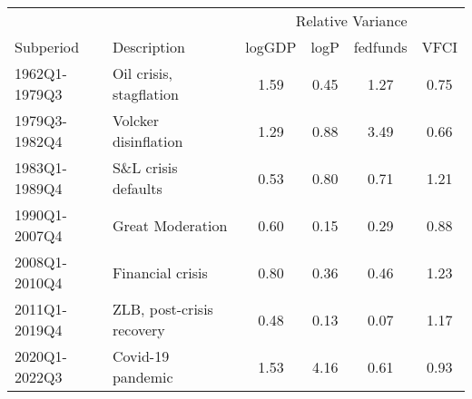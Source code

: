 \begingroup
\fontsize{12.0pt}{14.4pt}\selectfont
\begin{tabular}{llcccc}
\toprule
 &  & \multicolumn{4}{c}{Relative Variance} \\ 
\cmidrule(lr){3-6}
Subperiod & Description & logGDP & logP & fedfunds & VFCI \\ 
\midrule\addlinespace[2.5pt]
1962Q1-1979Q3 & Oil crisis, stagflation & 1.59 & 0.45 & 1.27 & 0.75 \\ 
1979Q3-1982Q4 & Volcker disinflation & 1.29 & 0.88 & 3.49 & 0.66 \\ 
1983Q1-1989Q4 & S\&L crisis defaults & 0.53 & 0.80 & 0.71 & 1.21 \\ 
1990Q1-2007Q4 & Great Moderation & 0.60 & 0.15 & 0.29 & 0.88 \\ 
2008Q1-2010Q4 & Financial crisis & 0.80 & 0.36 & 0.46 & 1.23 \\ 
2011Q1-2019Q4 & ZLB, post-crisis recovery & 0.48 & 0.13 & 0.07 & 1.17 \\ 
2020Q1-2022Q3 & Covid-19 pandemic & 1.53 & 4.16 & 0.61 & 0.93 \\ 
\bottomrule
\end{tabular}
\endgroup

